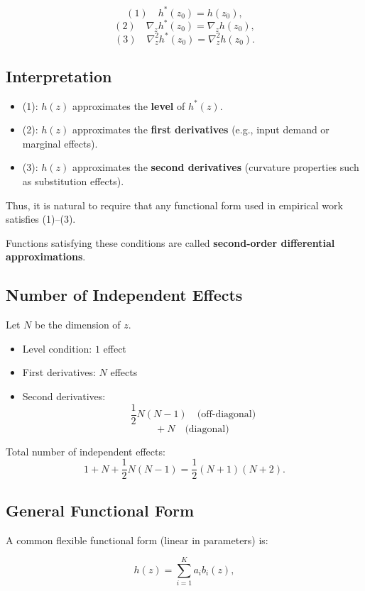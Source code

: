 \[
(1)\quad h^*(z_0) = h(z_0),
\]
\[
(2)\quad \nabla_z h^*(z_0) = \nabla_z h(z_0),
\]
\[
(3)\quad \nabla^2_z h^*(z_0) = \nabla^2_z h(z_0).
\]

\subsection*{Interpretation}

\begin{itemize}
    \item (1): $h(z)$ approximates the \textbf{level} of $h^*(z)$.
    \item (2): $h(z)$ approximates the \textbf{first derivatives}
    (e.g., input demand or marginal effects).
    \item (3): $h(z)$ approximates the \textbf{second derivatives}
    (curvature properties such as substitution effects).
\end{itemize}

Thus, it is natural to require that any functional form used in empirical
work satisfies (1)--(3).

Functions satisfying these conditions are called
\textbf{second-order differential approximations}.

\subsection*{Number of Independent Effects}

Let $N$ be the dimension of $z$.

\begin{itemize}
    \item Level condition: $1$ effect
    \item First derivatives: $N$ effects
    \item Second derivatives:
    \[
    \frac{1}{2}N(N-1) \quad \text{(off-diagonal)}
    \]
    \[
    +\ N \quad \text{(diagonal)}
    \]
\end{itemize}

Total number of independent effects:
\[
1 + N + \frac{1}{2}N(N-1)
=
\frac{1}{2}(N+1)(N+2).
\]

\subsection*{General Functional Form}

A common flexible functional form (linear in parameters) is:

\[
h(z)
=
\sum_{i=1}^{K} a_i b_i(z),
\]

